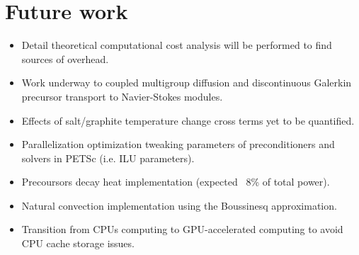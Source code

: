 \documentclass{anstrans}
\begin{document}
\section{Future work}
\begin{itemize}
	\item Detail theoretical computational cost analysis will be performed to find sources of overhead.
	\vspace{-0.6em}
	\item Work underway to coupled multigroup diffusion and discontinuous Galerkin precursor transport to Navier-Stokes modules.
	\vspace{-0.6em}
	\item Effects of salt/graphite temperature change cross terms yet to be quantified.
	\vspace{-0.6em}
	\item Parallelization optimization tweaking parameters of preconditioners and solvers in PETSc (i.e. ILU parameters).
	\vspace{-1.6em}
	\item Precoursors decay heat implementation (expected ~8\% of total power).
	\vspace{-0.6em}
	\item Natural convection implementation using the Boussinesq approximation. 
	\vspace{-0.6em}
	\item Transition from CPUs computing to GPU-accelerated computing to avoid CPU cache storage issues.
	\vspace{-0.6em}
\end{itemize}



\end{document}
